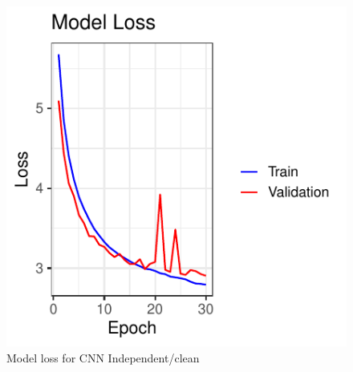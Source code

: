 \documentclass[letterpaper,9pt,twocolumn,twoside,]{pinp}
\begin{document}
\begin{figure}

{\centering \includegraphics{DATA3888_Final_report_files/figure-latex/cnn_independent_graph_loss-1} 

}

\caption{Model loss for CNN Independent/clean}\label{fig:cnn_independent_graph_loss}
\end{figure}
\end{document}
